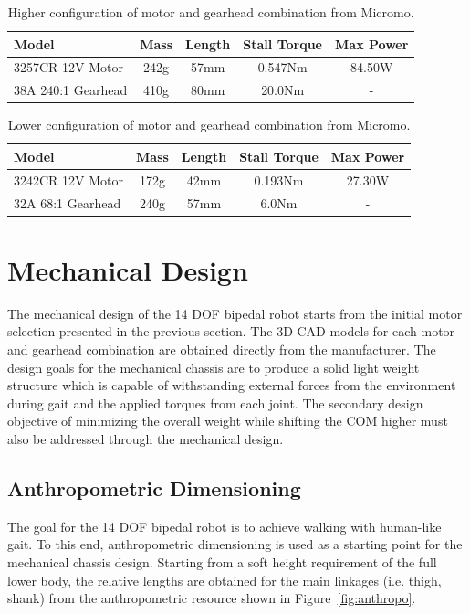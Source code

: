 \begin{table}[!h]
  \centering
  \caption{Higher configuration of motor and gearhead combination from Micromo.}
    \begin{tabular}{lcccc}
    \addlinespace
    \toprule
    \textbf{Model} & \textbf{Mass} & \textbf{Length} & \textbf{Stall Torque} & \textbf{Max Power}\\
    \midrule
    3257CR 12V Motor	&	242g	&	57mm	&	0.547Nm		&	84.50W	\\
    38A 240:1 Gearhead	&	410g	&	80mm	&	20.0Nm		&	-	\\
    \bottomrule
    \end{tabular}%
  \label{tab:higherconfig}%
\end{table}%

\begin{table}[!h]
  \centering
  \caption{Lower configuration of motor and gearhead combination from Micromo.}
    \begin{tabular}{lcccc}
    \addlinespace
    \toprule
    \textbf{Model} & \textbf{Mass} & \textbf{Length} & \textbf{Stall Torque} & \textbf{Max Power}\\
    \midrule
    3242CR 12V Motor	&	172g	&	42mm	&	0.193Nm		&	27.30W	\\
    32A 68:1 Gearhead	&	240g	&	57mm	&	6.0Nm		&	-	\\
    \bottomrule
    \end{tabular}%
  \label{tab:lowerconfig}%
\end{table}%

\section{Mechanical Design} %
\label{sec:chassis}

The mechanical design of the 14 DOF bipedal robot starts from the initial motor selection presented in the previous section. The 3D CAD models for each motor and gearhead combination are obtained directly from the manufacturer. The design goals for the mechanical chassis are to produce a solid light weight structure which is capable of withstanding external forces from the environment during gait and the applied torques from each joint. The secondary design objective of minimizing the overall weight while shifting the COM higher must also be addressed through the mechanical design. 

\subsection{Anthropometric Dimensioning} %
\label{sub:anthropometric_dimensioning}
The goal for the 14 DOF bipedal robot is to achieve walking with human-like gait. To this end, anthropometric dimensioning is used as a starting point for the mechanical chassis design. Starting from a soft height requirement of the full lower body, the relative lengths are obtained for the main linkages (i.e. thigh, shank) from the anthropometric resource shown in Figure~\ref{fig:anthropo}. 


